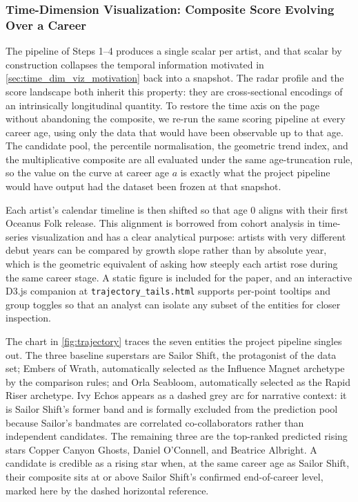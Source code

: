\documentclass[journal]{vgtc}                     %
\begin{document}
\subsubsection{Time-Dimension Visualization: Composite Score Evolving Over a Career}
\label{sec:time_dim_viz}
The pipeline of Steps 1--4 produces a single scalar per artist, and that scalar by construction collapses the temporal information motivated in \cref{sec:time_dim_viz_motivation} back into a snapshot. The radar profile and the score landscape both inherit this property: they are cross-sectional encodings of an intrinsically longitudinal quantity. To restore the time axis on the page without abandoning the composite, we re-run the same scoring pipeline at every career age, using only the data that would have been observable up to that age. The candidate pool, the percentile normalisation, the geometric trend index, and the multiplicative composite are all evaluated under the same age-truncation rule, so the value on the curve at career age $a$ is exactly what the project pipeline would have output had the dataset been frozen at that snapshot.

Each artist's calendar timeline is then shifted so that age $0$ aligns with their first Oceanus Folk release. This alignment is borrowed from cohort analysis in time-series visualization and has a clear analytical purpose: artists with very different debut years can be compared by growth slope rather than by absolute year, which is the geometric equivalent of asking how steeply each artist rose during the same career stage. A static figure is included for the paper, and an interactive D3.js companion at \texttt{trajectory\_tails.html} supports per-point tooltips and group toggles so that an analyst can isolate any subset of the entities for closer inspection.

The chart in \cref{fig:trajectory} traces the seven entities the project pipeline singles out. The three baseline superstars are Sailor Shift, the protagonist of the data set; Embers of Wrath, automatically selected as the Influence Magnet archetype by the comparison rules; and Orla Seabloom, automatically selected as the Rapid Riser archetype. Ivy Echos appears as a dashed grey arc for narrative context: it is Sailor Shift's former band and is formally excluded from the prediction pool because Sailor's bandmates are correlated co-collaborators rather than independent candidates. The remaining three are the top-ranked predicted rising stars Copper Canyon Ghosts, Daniel O'Connell, and Beatrice Albright. A candidate is credible as a rising star when, at the same career age as Sailor Shift, their composite sits at or above Sailor Shift's confirmed end-of-career level, marked here by the dashed horizontal reference.
\end{document}
